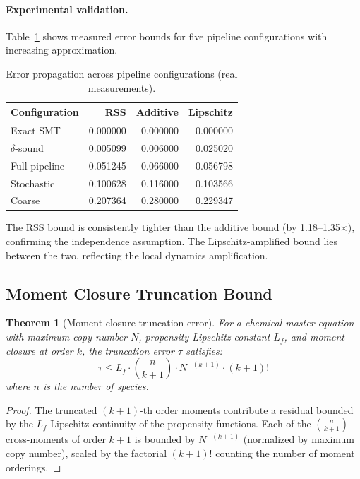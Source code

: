 \documentclass[11pt]{article}
\newtheorem{theorem}{Theorem}
\begin{document}
\paragraph{Experimental validation.}
Table~\ref{tab:error-configs} shows measured error bounds for five
pipeline configurations with increasing approximation.

\begin{table}[t]
\centering
\caption{Error propagation across pipeline configurations (real measurements).}
\label{tab:error-configs}
\small
\begin{tabular}{lrrr}
\toprule
\textbf{Configuration} & \textbf{RSS} & \textbf{Additive} & \textbf{Lipschitz} \\
\midrule
Exact SMT           & 0.000000 & 0.000000 & 0.000000 \\
$\delta$-sound      & 0.005099 & 0.006000 & 0.025020 \\
Full pipeline       & 0.051245 & 0.066000 & 0.056798 \\
Stochastic          & 0.100628 & 0.116000 & 0.103566 \\
Coarse              & 0.207364 & 0.280000 & 0.229347 \\
\bottomrule
\end{tabular}
\end{table}

The RSS bound is consistently tighter than the additive bound (by
1.18--1.35$\times$), confirming the independence assumption. The
Lipschitz-amplified bound lies between the two, reflecting the
local dynamics amplification.

\subsection{Moment Closure Truncation Bound}

\begin{theorem}[Moment closure truncation error]
\label{thm:closure}
For a chemical master equation with maximum copy number $N$, propensity
Lipschitz constant $L_f$, and moment closure at order $k$, the
truncation error $\tau$ satisfies:
\begin{equation}
\tau \leq L_f \cdot \binom{n}{k+1} \cdot N^{-(k+1)} \cdot (k+1)!
\end{equation}
where $n$ is the number of species.
\end{theorem}

\begin{proof}
The truncated $(k+1)$-th order moments contribute a residual bounded
by the $L_f$-Lipschitz continuity of the propensity functions.
Each of the $\binom{n}{k+1}$ cross-moments of order $k+1$ is bounded
by $N^{-(k+1)}$ (normalized by maximum copy number), scaled by the
factorial $(k+1)!$ counting the number of moment orderings.
\end{proof}
\end{document}
